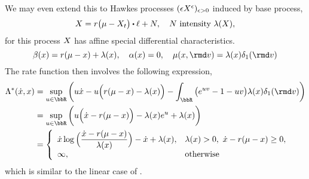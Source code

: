 \begin{example}
  We may even extend this to Hawkes processes $(\epsilon X^\epsilon)_{\epsilon>0}$ induced by base process,
  \begin{equation*}
    \X = \hawkesRate\big(\mu- \X_t \big) \shortInt \leb + \N, \quad \N \text{ intensity } \affInt(\X),
  \end{equation*}
  for this process $X$ has affine special differential characteristics.
  \begin{equation*}
    \affDrift(\stateVar) = \hawkesRate(\mu - \stateVar) + \affInt(\stateVar), \quad
    \affDiff(\stateVar) = 0, \quad
    \affJump(\stateVar, \rmd\markVar) = \affInt(\stateVar) \delta_1(\rmd\markVar)
  \end{equation*}
  The rate function then involves the following expression,
  \begin{align*}
    \ode^*(\diffVar, \stateVar) 
    &= \sup_{\momentVar\in\bbR} \bigg( \momentVar\diffVar - \momentVar\Big(\hawkesRate(\mu - \stateVar) - \affInt(\stateVar)\Big) - \int_\bbR \big( e^{\momentVar\markVar} - 1 - \momentVar\markVar \big) \affInt(\stateVar) \delta_1(\rmd\markVar) \bigg) \\
    &= \sup_{\momentVar\in\bbR} \bigg( \momentVar\Big(\diffVar - \hawkesRate(\mu-\stateVar)\Big) - \affInt(\stateVar)e^\momentVar + \affInt(\stateVar) \bigg) \\
    &= \left\{\begin{array}{ll}
      \displaystyle \diffVar \log\Big(\frac{\diffVar-\hawkesRate(\mu-\stateVar)}{\affInt(\stateVar)}\Big) - \diffVar + \affInt(\stateVar), &  \affInt(\stateVar) > 0, ~ \diffVar - \hawkesRate(\mu-\stateVar) \geq 0, \\
      \infty, & \text{otherwise}
    \end{array}\right.
  \end{align*}
  which is similar to the linear case of \cite{gao2018b}.
\end{example}
